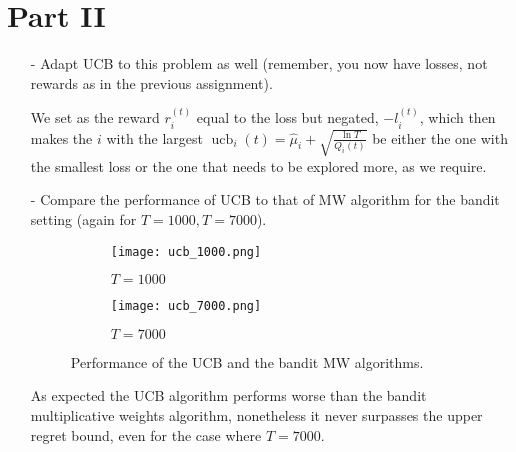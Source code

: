 \documentclass[11pt, final]{article}
\begin{document}
	\newpage
	
	\section*{Part II}
	\begin{itemize}
		\item[-] Adapt UCB to this problem as well (remember, you now have losses, not rewards as in the previous assignment).
		
		We set as the reward $r_i^{(t)}$ equal to the loss but negated, $-l_i^{(t)}$, which then makes the $i$ with the largest $\operatorname{ucb}_i(t) = \hat{\mu}_i + \sqrt{\frac{\ln T}{Q_i(t)}}$ be either the one with the smallest loss or the one that needs to be explored more, as we require.
		
		\item[-] Compare the performance of UCB to that of MW algorithm for the bandit setting (again for $T = 1000, T = 7000$).
		\begin{figure}[h!]
			\centering
			\begin{subfigure}[b]{0.45\textwidth}
				\centering
				\texttt{[image: ucb\_1000.png]}
				\caption{$T = 1000$}
			\end{subfigure}
			\hfill
			\begin{subfigure}[b]{0.45\textwidth}
				\centering
				\texttt{[image: ucb\_7000.png]}
				\caption{$T = 7000$}
			\end{subfigure}
			\caption{Performance of the UCB and the bandit MW algorithms.}
		\end{figure}
		
		As expected the UCB algorithm performs worse than the bandit multiplicative weights algorithm, nonetheless it never surpasses the upper regret bound, even for the case where $T = 7000$.
		
	\end{itemize}
	
\end{document}
